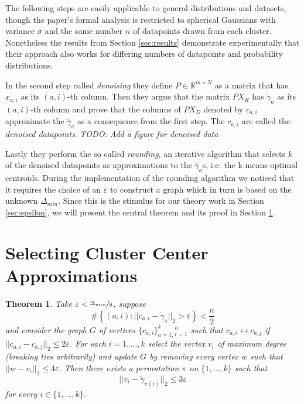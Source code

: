 \documentclass[10pt,a4paper]{article}
\newtheorem{theorem}{Theorem}
\begin{document}
The following steps are easily applicable to general distributions and datasets, though the paper's formal analysis is restricted to spherical Gaussians with variance $\sigma$ and the same number $n$ of datapoints drawn from each cluster.
Nonetheless the results from Section \ref{sec:results} demonstrate experimentally that their approach also works for differing numbers of datapoints and probability distributions.

In the second step called \emph{denoising} they define $P \in \mathbb{R}^{m \times N}$ as a matrix that has $x_{a, i}$ as its $(a, i)$-th column.
Then they argue that the matrix $PX_{R}$ has $\tilde{\gamma}_{a}$ as its $(a, i)$-th column and prove that the columns of $PX_{D}$ denoted by $c_{a, i}$ approximate the $\tilde{\gamma}_{a}$ as a consequence from the first step.
The $c_{a, i}$ are called the \emph{denoised datapoints}.
\emph{TODO: Add a figure for denoised data}

Lastly they perform the so called \emph{rounding}, an iterative algorithm that selects $k$ of the denoised datapoints as approximations to the $\tilde{\gamma}_{a}$s, i.e. the k-means-optimal centroids.
During the implementation of the rounding algorithm we noticed that it requires the choice of an $\varepsilon$ to construct a graph which in turn is based on the unknown $\Delta_{min}$.
Since this is the stimulus for our theory work in Section \ref{sec:epsilon}, we will present the central theorem and its proof in Section \ref{sec:rounding}.

\section{Selecting Cluster Center Approximations}
\label{sec:rounding}

\begin{theorem}
  Take $\varepsilon < \nicefrac{\Delta_{min}}{8}$, suppose
  \begin{equation*}
    \#\left\{ (a, i) : ||c_{a, i} - \tilde{\gamma}_{a}||_{2} > \varepsilon \right\} < \frac{n}{2}
  \end{equation*}
  and consider the graph $G$ of vertices $\{ c_{a, i} \}_{a = 1,}^{k}{}_{i = 1}^{n}$ such that $c_{a, i} \leftrightarrow c_{b, j}$ if $||c_{a, i} - c_{b, j}||_{2} \le 2\varepsilon$.
  For each $i = 1, \dots, k$ select the vertex $v_{i}$ of maximum degree (breaking ties arbitrarily) and update $G$ by removing every vertex $w$ such that $||w - v_{i}||_{2} \le 4\varepsilon$.
  Then there exists a permutation $\pi$ on $\{ 1, \dots, k \}$ such that
  \begin{equation*}
    ||v_{i} - \tilde{\gamma}_{\pi(i)}||_{2} \le 3\varepsilon
  \end{equation*}
  for every $i \in \{ 1, \dots, k \}$.
\end{theorem}
\end{document}
